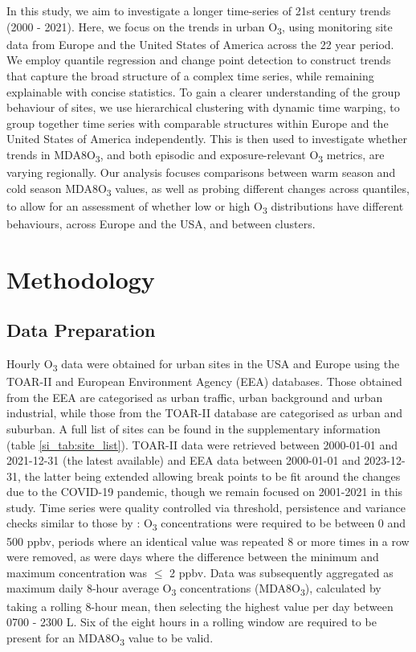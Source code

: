 \documentclass[journal abbreviation, manuscript]{copernicus}
\begin{document}
In this study, we aim to investigate a longer time-series of 21st century trends (2000 - 2021). Here, we focus on the trends in urban O\textsubscript{3}, using monitoring site data from Europe and the United States of America across the 22 year period. We employ quantile regression and change point detection to construct trends that capture the broad structure of a complex time series, while remaining explainable with concise statistics. To gain a clearer understanding of the group behaviour of sites, we use hierarchical clustering with dynamic time warping, to group together time series with comparable structures within Europe and the United States of America independently. This is then used to investigate whether trends in MDA8O\textsubscript{3}, and both episodic and exposure-relevant O\textsubscript{3} metrics, are varying regionally. Our analysis focuses comparisons between warm season and cold season MDA8O\textsubscript{3} values, as well as probing different changes across quantiles, to allow for an assessment of whether low or high O\textsubscript{3} distributions have different behaviours, across Europe and the USA, and between clusters.

\section{Methodology} \label{sect:method}

\subsection{Data Preparation} \label{sect:data_prep}
Hourly O\textsubscript{3} data were obtained for urban sites in the USA and Europe using the TOAR-II \citep{toar_db} and European Environment Agency (EEA) \citep{eea_1, eea_2} databases. Those obtained from the EEA are categorised as urban traffic, urban background and urban industrial, while those from the TOAR-II database are categorised as urban and suburban. A full list of sites can be found in the supplementary information (table \ref{si_tab:site_list}).  TOAR-II data were retrieved between 2000-01-01 and 2021-12-31 (the latest available) and EEA data between 2000-01-01 and 2023-12-31, the latter being extended allowing break points to be fit around the changes due to the COVID-19 pandemic, though we remain focused on 2001-2021 in this study. Time series were quality controlled via threshold, persistence and variance checks similar to those by \cite{Wang2023}: O\textsubscript{3} concentrations were required to be between 0 and 500 ppbv, periods where an identical value was repeated 8 or more times in a row were removed, as were days where the difference between the minimum and maximum concentration was $\leq$ 2 ppbv. Data was subsequently aggregated as  maximum daily 8-hour average O\textsubscript{3} concentrations (MDA8O\textsubscript{3}),  calculated by taking a rolling 8-hour mean, then selecting the highest value per day between 0700 - 2300 L. Six of the eight hours in a rolling window are required to be present for an MDA8O\textsubscript{3} value to be valid.
\end{document}
